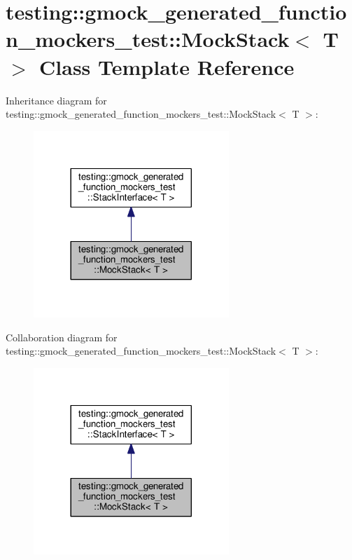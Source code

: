 \hypertarget{classtesting_1_1gmock__generated__function__mockers__test_1_1MockStack}{}\section{testing\+:\+:gmock\+\_\+generated\+\_\+function\+\_\+mockers\+\_\+test\+:\+:Mock\+Stack$<$ T $>$ Class Template Reference}
\label{classtesting_1_1gmock__generated__function__mockers__test_1_1MockStack}


Inheritance diagram for testing\+:\+:gmock\+\_\+generated\+\_\+function\+\_\+mockers\+\_\+test\+:\+:Mock\+Stack$<$ T $>$\+:\nopagebreak
\begin{figure}[H]
\begin{center}
\leavevmode
\includegraphics[width=209pt]{classtesting_1_1gmock__generated__function__mockers__test_1_1MockStack__inherit__graph}
\end{center}
\end{figure}


Collaboration diagram for testing\+:\+:gmock\+\_\+generated\+\_\+function\+\_\+mockers\+\_\+test\+:\+:Mock\+Stack$<$ T $>$\+:\nopagebreak
\begin{figure}[H]
\begin{center}
\leavevmode
\includegraphics[width=209pt]{classtesting_1_1gmock__generated__function__mockers__test_1_1MockStack__coll__graph}
\end{center}
\end{figure}
